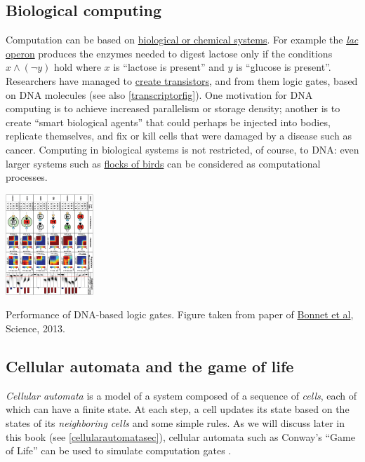 \subsection{Biological computing}\label{Biological-computing}

Computation can be based on
\href{http://www.nature.com/nrg/journal/v13/n7/full/nrg3197.html}{biological
or chemical systems}. For example the
\href{https://en.wikipedia.org/wiki/Lac_operon}{\emph{lac} operon}
produces the enzymes needed to digest lactose only if the conditions
\(x \wedge (\neg y)\) hold where \(x\) is ``lactose is present'' and
\(y\) is ``glucose is present''. Researchers have managed to
\href{http://science.sciencemag.org/content/340/6132/554?iss=6132}{create
transistors}, and from them logic gates, based on DNA molecules (see
also \cref{transcriptorfig}). One motivation for DNA computing is to
achieve increased parallelism or storage density; another is to create
``smart biological agents'' that could perhaps be injected into bodies,
replicate themselves, and fix or kill cells that were damaged by a
disease such as cancer. Computing in biological systems is not
restricted, of course, to DNA: even larger systems such as
\href{https://www.cs.princeton.edu/~chazelle/pubs/cacm12-natalg.pdf}{flocks
of birds} can be considered as computational processes.


\begin{marginfigure}
\centering
\includegraphics[width=\linewidth, height=1.5in, keepaspectratio]{../figure/transcriptor.jpg}
\caption{Performance of DNA-based logic gates. Figure taken from paper
of
\href{http://science.sciencemag.org/content/early/2013/03/27/science.1232758.full}{Bonnet
et al}, Science, 2013.}
\label{transcriptorfig}
\end{marginfigure}

\subsection{Cellular automata and the game of
life}\label{Cellular-automata-and-the}

\emph{Cellular automata} is a model of a system composed of a sequence
of \emph{cells}, each of which can have a finite state. At each step, a
cell updates its state based on the states of its \emph{neighboring
cells} and some simple rules. As we will discuss later in this book (see
\cref{cellularautomatasec}), cellular automata such as Conway's ``Game
of Life'' can be used to simulate computation gates .


